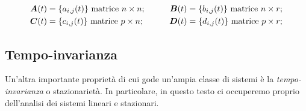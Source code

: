 \documentclass[a4paper]{article}
\renewcommand{\vec}{\bm}
\theoremstyle{definition}
\begin{document}
		\begin{align*}
			\vec{A}(t) &= \{a_{i,j} (t) \} \ \textup{matrice} \ n\times n;\qquad
			&\vec{B}(t) = \{b_{i,j}(t) \} \ \textup{matrice} \ n\times r; \\
			\vec{C}(t) &= \{c_{i,j} (t) \} \ \textup{matrice} \ p\times n;\qquad
			&\vec{D}(t) = \{d_{i,j}(t) \} \ \textup{matrice} \ p\times r; 
		\end{align*}
		
	\subsection{Tempo-invarianza}
		Un'altra importante proprietà di cui gode un'ampia classe di sistemi è la \textit{tempo-invarianza} o stazionarietà. In particolare, in questo testo ci occuperemo proprio dell'analisi dei sistemi
		lineari e stazionari.
		
\end{document}
